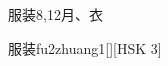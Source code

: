 \begin{entry}{服装}{8,12}{⽉、⾐}
  \begin{phonetics}{服装}{fu2zhuang1}[][HSK 3]
  \end{phonetics}
\end{entry}
